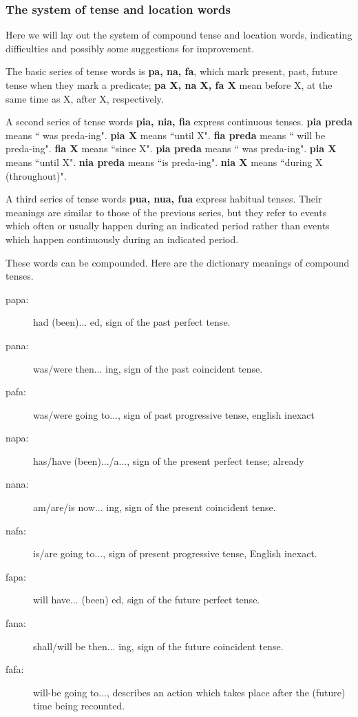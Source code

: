 \documentclass[12pt]{book}
\begin{document}
\subsubsection{The system of tense and location words}

Here we will lay out the system of compound tense and location words, indicating difficulties and possibly some suggestions for improvement.

The basic series of tense words is {\bf pa, na, fa}, which mark present, past, future tense when they mark a predicate; {\bf pa X, na X, fa X} mean before X, at the same time as X,
after X, respectively.

A second series of tense words {\bf pia, nia, fia}  express continuous tenses.   {\bf pia preda} means `` was preda-ing".   {\bf pia X} means ``until X".   {\bf fia preda} means `` will be preda-ing".   {\bf fia X} means ``since X".   {\bf pia preda} means `` was preda-ing".   {\bf pia X} means ``until X".   {\bf nia preda} means ``is preda-ing".   {\bf nia X} means ``during X (throughout)".

A third series of tense words {\bf pua, nua, fua}  express habitual tenses.   Their meanings are similar to those of the previous series, but they refer to events which often or usually
happen during an indicated period rather than events which happen continuously during an indicated period.

These words can be compounded.  Here are the dictionary meanings of compound tenses.

\begin{description}

\item[papa:]  had (been)... ed, sign of the past perfect tense.

\item[pana:]  was/were then... ing, sign of the past coincident tense.

\item[pafa:]  was/were going to..., sign of past progressive tense, english inexact

\item[napa:]  has/have (been).../a..., sign of the present perfect tense; already

\item[nana:]  am/are/is now... ing, sign of the present coincident tense.

\item[nafa:]  is/are going to..., sign of present progressive tense, English inexact.

\item[fapa:]  will have... (been) ed, sign of the future perfect tense.

\item[fana:]  shall/will be then... ing, sign of the future coincident tense.

\item[fafa:]  will-be going to..., describes an action which takes place after the (future) time being recounted.

\end{description}
\end{document}
